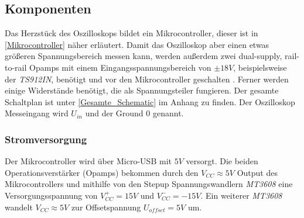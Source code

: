 \subsection{Komponenten}

Das Herzstück des Oszilloskops bildet ein Mikrocontroller, dieser ist in \ref{Mikrocontroller} näher
erläutert. Damit das Oszilloskop aber einen etwas größeren Spannungsbereich messen kann, werden außerdem
zwei dual-supply, rail-to-rail Opamps mit einem Eingangsspannungsbereich von $\pm18V$,
beispielsweise der \textit{TS912IN}, benötigt und vor den Mikrocontroller geschalten
\cite{Opamp_Datasheet}.
Ferner werden einige Widerstände benötigt, die als Spannungsteiler fungieren.
Der gesamte Schaltplan ist unter \ref{Gesamte_Schematic} im Anhang zu finden.
Der Oszilloskop Messeingang wird $U_{in}$ und der Ground $0$ genannt.


\subsubsection{Stromversorgung}
Der Mikrocontroller wird über Micro-USB mit $5V$ versorgt. \newline
Die beiden Operationsverstärker (Opamps) bekommen durch den $V_{CC} \approx 5V$ Output
des Mikrocontrollers und
mithilfe von den Stepup Spannungswandlern \textit{MT3608} eine Versorgungsspannung
von $V^{+}_{CC} = 15V$ und $V^{-}_{CC} = -15V$.
Ein weiterer \textit{MT3608} wandelt $V_{CC} \approx 5V$ zur Offsetspannung $U_{offset} = 5V$ um.




